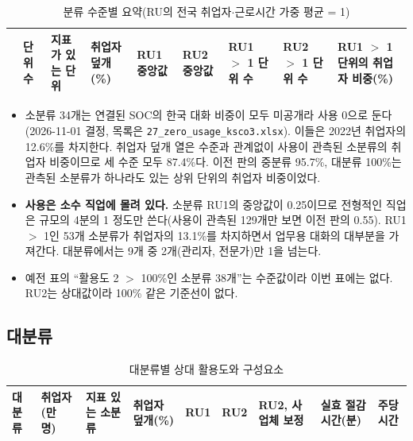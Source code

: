 \documentclass[11pt]{article}
\begin{document}
\begin{longtable}{L{1.6cm}R{1.3cm}R{1.7cm}R{1.8cm}R{1.8cm}R{1.8cm}R{1.6cm}R{1.6cm}R{2.0cm}}
\caption{분류 수준별 요약(RU의 전국 취업자$\cdot$근로시간 가중 평균 = 1)}\label{tab:summary}\\
\toprule
 & 단위 수 & 지표가 있는 단위 & 취업자 덮개(\%) & RU1 중앙값 & RU2 중앙값 & RU1 $>$ 1 단위 수 & RU2 $>$ 1 단위 수 & RU1 $>$ 1 단위의 취업자 비중(\%) \\
\midrule

\bottomrule
\end{longtable}

\begin{itemize}[leftmargin=*]
  \item 소분류 34개는 연결된 SOC의 한국 대화 비중이 모두 미공개라 사용 0으로 둔다(2026-11-01 결정, 목록은 \texttt{27\_zero\_usage\_ksco3.xlsx}). 이들은 2022년 취업자의 12.6\%를 차지한다. 취업자 덮개 열은 수준과 관계없이 사용이 관측된 소분류의 취업자 비중이므로 세 수준 모두 87.4\%다. 이전 판의 중분류 95.7\%, 대분류 100\%는 관측된 소분류가 하나라도 있는 상위 단위의 취업자 비중이었다.
  \item \textbf{사용은 소수 직업에 몰려 있다.} 소분류 RU1의 중앙값이 0.25이므로 전형적인 직업은 규모의 4분의 1 정도만 쓴다(사용이 관측된 129개만 보면 이전 판의 0.55). RU1 $>$ 1인 53개 소분류가 취업자의 13.1\%를 차지하면서 업무용 대화의 대부분을 가져간다. 대분류에서는 9개 중 2개(관리자, 전문가)만 1을 넘는다.
  \item 예전 표의 ``활용도 2 $>$ 100\%인 소분류 38개''는 수준값이라 이번 표에는 없다. RU2는 상대값이라 100\% 같은 기준선이 없다.
\end{itemize}

\subsection{대분류}

\begin{longtable}{L{4.2cm}R{1.3cm}R{1.4cm}R{1.3cm}R{1.3cm}R{1.3cm}R{1.6cm}R{1.4cm}R{1.3cm}}
\caption{대분류별 상대 활용도와 구성요소}\label{tab:ksco1}\\
\toprule
대분류 & 취업자(만 명) & 지표 있는 소분류 & 취업자 덮개(\%) & RU1 & RU2 & RU2, 사업체 보정 & 실효 절감 시간(분) & 주당 시간 \\
\midrule

\bottomrule
\end{longtable}
\end{document}
